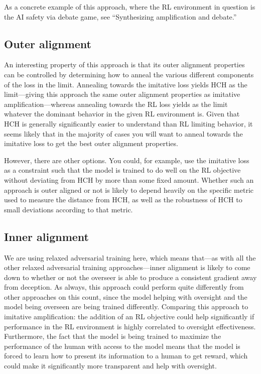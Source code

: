 \documentclass[
  onecolumn,
  natbib,
]{miri-tech-article}
\begin{document}
\vspace{2mm}

\noindent As a concrete example of this approach, where the RL environment in question is the AI safety via debate game, see ``Synthesizing amplification and debate.''\cite{synthesizing}

\subsection{Outer alignment} An interesting property of this approach is that its outer alignment properties can be controlled by determining how to anneal the various different components of the loss in the limit. Annealing towards the imitative loss yields HCH as the limit---giving this approach the same outer alignment properties as imitative amplification---whereas annealing towards the RL loss yields as the limit whatever the dominant behavior in the given RL environment is. Given that HCH is generally significantly easier to understand than RL limiting behavior, it seems likely that in the majority of cases you will want to anneal towards the imitative loss to get the best outer alignment properties. 

However, there are other options. You could, for example, use the imitative loss as a constraint such that the model is trained to do well on the RL objective without deviating from HCH by more than some fixed amount. Whether such an approach is outer aligned or not is likely to depend heavily on the specific metric used to measure the distance from HCH, as well as the robustness of HCH to small deviations according to that metric.

\subsection{Inner alignment} We are using relaxed adversarial training here, which means that---as with all the other relaxed adversarial training approaches---inner alignment is likely to come down to whether or not the overseer is able to produce a consistent gradient away from deception. As always, this approach could perform quite differently from other approaches on this count, since the model helping with oversight and the model being overseen are being trained differently. Comparing this approach to imitative amplification: the addition of an RL objective could help significantly if performance in the RL environment is highly correlated to oversight effectiveness. Furthermore, the fact that the model is being trained to maximize the performance of the human with access to the model means that the model is forced to learn how to present its information to a human to get reward, which could make it significantly more transparent and help with oversight.
\end{document}

